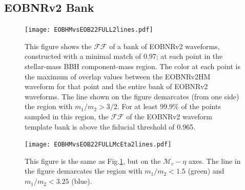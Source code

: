\documentclass[aps,
prd,
amsmath,
amssymb,
twocolumn,
floatfix,
groupedaddress]{revtex4-1}
\newcommand{\FF}{\mathcal{FF}}
\begin{document}
\subsection{EOBNRv2 Bank}\label{sec:level2:EffectualnessEOBNRv2}
\begin{figure}
\centering
\texttt{[image: EOBHMvsEOB22FULL2lines.pdf]}
\caption{\label{fig:match_eob22eobhm_m1m2}This figure shows the $\FF$ of a bank of EOBNRv2 waveforms, constructed with a minimal match of 0.97; at each point in the stellar-mass BBH component-mass region. The color at each point is the maximum of overlap values between the EOBNRv2HM waveform for that point and the entire bank of EOBNRv2 waveforms. The line shown on the figure demarcates (from one side) the region with $m_1/m_2>3/2$. For at least $99.9\%$ of the points sampled in this region, the $\FF$ of the EOBNRv2 waveform template bank is above the fiducial threshold of 0.965.}
\end{figure}
\begin{figure}
\centering
\texttt{[image: EOBHMvsEOB22FULLMcEta2lines.pdf]}
\caption{\label{fig:match_eob22eobhm_mceta}This figure is the same as
Fig.\ref{fig:match_eob22eobhm_m1m2}, but on the $\mathcal{M}_c-\eta$ axes. The
line in the figure demarcates the region with $m_1/m_2 < 1.5$ (green) and
$m_1/m_2 < 3.25$ (blue).}
\end{figure}
\end{document}
